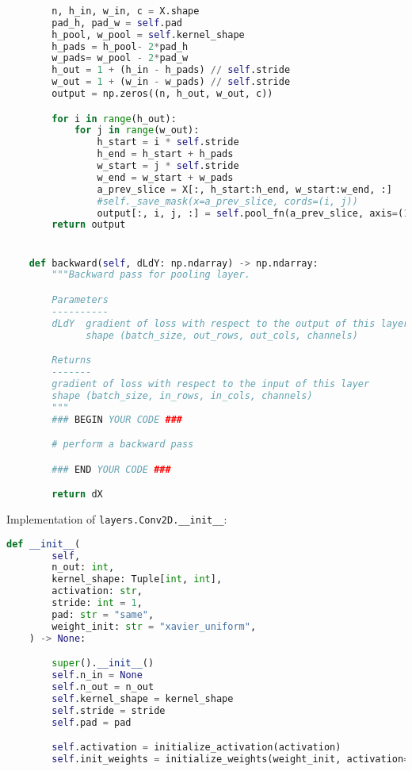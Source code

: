 \begin{lstlisting}[language=Python]
    
        n, h_in, w_in, c = X.shape
        pad_h, pad_w = self.pad
        h_pool, w_pool = self.kernel_shape
        h_pads = h_pool- 2*pad_h
        w_pads= w_pool - 2*pad_w
        h_out = 1 + (h_in - h_pads) // self.stride
        w_out = 1 + (w_in - w_pads) // self.stride
        output = np.zeros((n, h_out, w_out, c))

        for i in range(h_out):
            for j in range(w_out):
                h_start = i * self.stride
                h_end = h_start + h_pads
                w_start = j * self.stride
                w_end = w_start + w_pads
                a_prev_slice = X[:, h_start:h_end, w_start:w_end, :]
                #self._save_mask(x=a_prev_slice, cords=(i, j))
                output[:, i, j, :] = self.pool_fn(a_prev_slice, axis=(1, 2))
        return output


    def backward(self, dLdY: np.ndarray) -> np.ndarray:
        """Backward pass for pooling layer.

        Parameters
        ----------
        dLdY  gradient of loss with respect to the output of this layer
              shape (batch_size, out_rows, out_cols, channels)

        Returns
        -------
        gradient of loss with respect to the input of this layer
        shape (batch_size, in_rows, in_cols, channels)
        """
        ### BEGIN YOUR CODE ###

        # perform a backward pass

        ### END YOUR CODE ###

        return dX

\end{lstlisting}

Implementation of \texttt{layers.Conv2D.__init__}:

\begin{lstlisting}[language=Python]
    def __init__(
        self,
        n_out: int,
        kernel_shape: Tuple[int, int],
        activation: str,
        stride: int = 1,
        pad: str = "same",
        weight_init: str = "xavier_uniform",
    ) -> None:

        super().__init__()
        self.n_in = None
        self.n_out = n_out
        self.kernel_shape = kernel_shape
        self.stride = stride
        self.pad = pad

        self.activation = initialize_activation(activation)
        self.init_weights = initialize_weights(weight_init, activation=activation)

\end{lstlisting}

